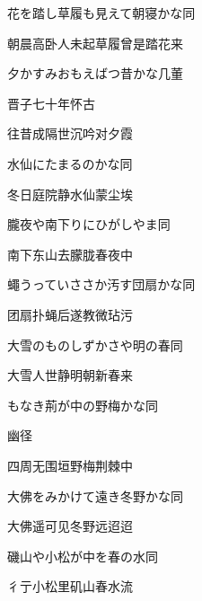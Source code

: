 \begin{haiku}
    {\FH 花を踏し草履も見えて朝寝かな}\hfill{\FH 同}

    {\FK 朝晨高卧人未起草履曾是踏花来}
\end{haiku}

\begin{haiku}
    {\FH 夕かすみおもえばつ昔かな}\hfill{\FH 几董}

    {\FK 晋子七十年怀古}

    {\FK 往昔成隔世沉吟对夕霞}
\end{haiku}

\begin{haiku}
    {\FH 水仙にたまるのかな}\hfill{\FH 同}

    {\FK 冬日庭院静水仙蒙尘埃}
\end{haiku}

\begin{haiku}
    {\FH 朧夜や南下りにひがしやま}\hfill{\FH 同}

    {\FK 南下东山去朦胧春夜中}
\end{haiku}

\begin{haiku}
    {\FH 蠅うっていささか汚す団扇かな}\hfill{\FH 同}

    {\FK 团扇扑蝇后遂教微玷污}
\end{haiku}

\begin{haiku}
    {\FH 大雪のものしずかさや明の春}\hfill{\FH 同}

    {\FK 大雪人世静明朝新春来}
\end{haiku}

\begin{haiku}
    {\FH {}もなき荊が中の野梅かな}\hfill{\FH 同}

    {\FK 幽径}

    {\FK 四周无围垣野梅荆棘中}
\end{haiku}

\begin{haiku}
    {\FH 大佛をみかけて遠き冬野かな}\hfill{\FH 同}

    {\FK 大佛遥可见冬野远迢迢}
\end{haiku}

\begin{haiku}
    {\FH 磯山や小松が中を春の水}\hfill{\FH 同}

    {\FK 彳亍小松里矶山春水流}
\end{haiku}

